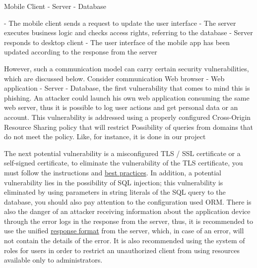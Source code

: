 Mobile Client - Server - Database

- The mobile client sends a request to update the user interface
- The server executes business logic and checks access rights, referring to the database
- Server responds to desktop client
- The user interface of the mobile app has been updated according to the response from the server

However, such a communication model can carry certain security vulnerabilities, which are discussed below.
Consider communication Web browser - Web application - Server - Database, the first vulnerability that comes to mind
this is phishing.
An attacker could launch his own web application consuming the same web server, thus
it is possible to log user actions and get personal data or an account.
This vulnerability is addressed using a properly configured Cross-Origin Resource Sharing policy that will restrict
Possibility of queries from domains that do not meet the policy.
Like, for instance, it is done in our project



The next potential vulnerability is a misconfigured TLS / SSL certificate or a self-signed certificate,
to eliminate the vulnerability of the TLS certificate, you must follow the instructions and
\href{https://www.ssl.com/guide/ssl-best-practices/}{best practices}.
In addition, a potential vulnerability lies in the possibility of SQL injection;
this vulnerability is eliminated by using
parameters in string literals of the SQL query to the database, you should also pay attention to the configuration used
ORM\@.
There is also the danger of an attacker receiving information about the application device through the error logs in the
response from the server, thus, it is recommended to use the unified \href{https://datatracker.ietf.org/doc/html/rfc7231}{response format}
from the server, which, in case of an error, will not contain the details of the error.
It is also recommended using the system of roles for users in order to restrict an unauthorized client from using
resources available only to administrators.

